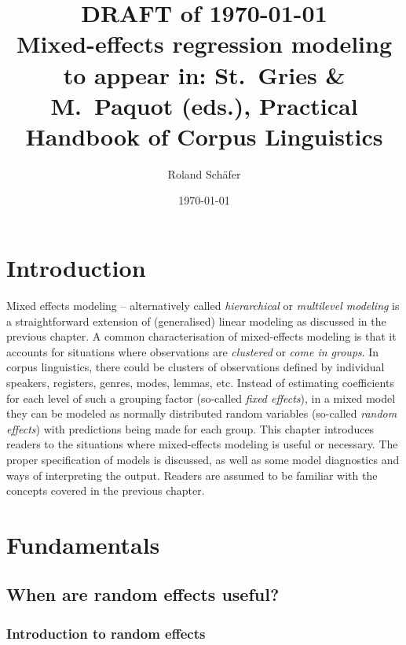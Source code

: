 \documentclass[a4paper,12pt]{article}
\title{{\small DRAFT of \today}\\Mixed-effects regression modeling\\\small to appear in: St.~Gries \& M.~Paquot (eds.), Practical Handbook of Corpus Linguistics}
\author{Roland Schäfer}
\affil{Freie Universität Berlin}
\date{\today}
\begin{document}
       

\maketitle

\section{Introduction}
\label{sec:introduction}

Mixed effects modeling -- alternatively called \textit{hierarchical} or \textit{multilevel modeling} is a straightforward extension of (generalised) linear modeling as discussed in the previous chapter.
A common characterisation of mixed-effects modeling is that it accounts for situations where observations are \textit{clustered} or \textit{come in groups}.
In corpus linguistics, there could be clusters of observations defined by individual speakers, registers, genres, modes, lemmas, etc.
Instead of estimating coefficients for each level of such a grouping factor (so-called \textit{fixed effects}), in a mixed model they can be modeled as normally distributed random variables (so-called \textit{random effects}) with predictions being made for each group.
This chapter introduces readers to the situations where mixed-effects modeling is useful or necessary.
The proper specification of models is discussed, as well as some model diagnostics and ways of interpreting the output.
Readers are assumed to be familiar with the concepts covered in the previous chapter.

\section{Fundamentals}
\label{sec:fundamentals}

\subsection{When are random effects useful?}
\label{sec:whenrandomeffectsareuseful}

\subsubsection{Introduction to random effects}
\label{sec:introductiontorandomeffects}
\end{document}
